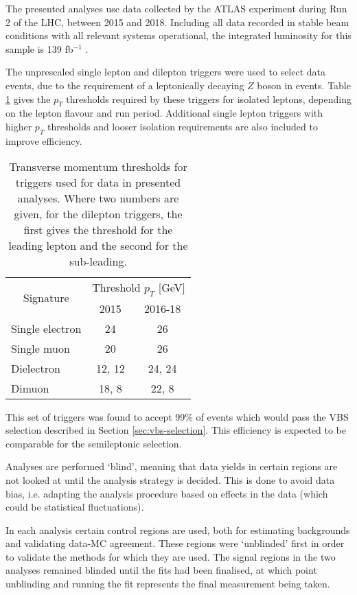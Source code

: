 
The presented analyses use data collected by the \ac{ATLAS} experiment during
Run 2 of the \ac{LHC}, between 2015 and 2018. Including all data recorded in
stable beam conditions with all relevant systems operational, the integrated
luminosity for this sample is 139 fb$^{-1}$ \cite{ATLASdq2020}.

The unprescaled single lepton and dilepton triggers
\cite{ATLAStrigegam2020,ATLAStrigmuon2020}
were used to select data events, due to the requirement of a leptonically
decaying $Z$ boson in events. Table \ref{tab:methods-data-triggers} gives the
$p_T$ thresholds required by these triggers for isolated leptons, depending on
the lepton flavour and run period. Additional single lepton triggers with higher
$p_T$ thresholds and looser isolation requirements are also included to improve
efficiency.

\begin{table}[!b]
  \centering
  \renewcommand\arraystretch{1.2}
  \caption{
    Transverse momentum thresholds for triggers used for data in presented analyses.
    Where two numbers are given, for the dilepton triggers, the first gives the
    threshold for the leading lepton and the second for the sub-leading.
  }
  \label{tab:methods-data-triggers}
  \begin{tabular}{lcc}
    \hline\hline
    \multicolumn{1}{c}{\multirow{2}{*}{Signature}} & \multicolumn{2}{c}{Threshold $p_T$ [GeV]} \\
    \cline{2-3}
              & 2015    &   2016-18 \\
    \hline
    Single electron  &  24     &  26     \\   
    Single muon      &  20     &  26     \\   
    Dielectron       &  12, 12  &  24, 24  \\
    Dimuon           &  18, 8   &  22, 8   \\
    \hline\hline
  \end{tabular}
\end{table}

This set of triggers was found to accept 99\% of events which would pass the
\acs{VBS} \Zy selection described in Section \ref{sec:vbs-selection}. This
efficiency is expected to be comparable for the semileptonic \VZy selection.

Analyses are performed `blind', meaning that data yields in certain regions are
not looked at until the analysis strategy is decided. This is done to avoid data
bias, i.e. adapting the analysis procedure based on effects in the data (which
could be statistical fluctuations).

In each analysis certain control regions are used, both for estimating
backgrounds and validating data-\ac{MC} agreement. These regions were `unblinded'
first in order to validate the methods for which they are used. The signal
regions in the two analyses remained blinded until the fits had been finalised,
at which point unblinding and running the fit represents the final measurement
being taken.
